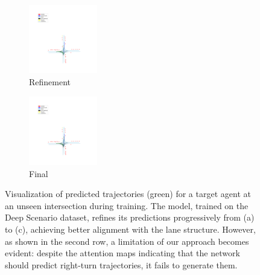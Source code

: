 \begin{figure}
\begin{subfigure}[t]{0.3\linewidth}
        \includegraphics[height=3cm,trim={280 170 300 380},clip]{images_results/1337_minADE5_9.3_1-min.png}
        \caption{Refinement}
    \end{subfigure}
    \begin{subfigure}[t]{0.3\linewidth}
        \includegraphics[height=3cm,trim={280 170 300 380},clip]{images_results/1337_minADE5_9.3_2-min.png}
        \caption{Final}
    \end{subfigure}
    \caption{Visualization of predicted trajectories (green) for a target agent at an unseen intersection during training. The model, trained on the Deep Scenario dataset, refines its predictions progressively from (a) to (c), achieving better alignment with the lane structure. However, as shown in the second row, a limitation of our approach becomes evident: despite the attention maps indicating that the network should predict right-turn trajectories, it fails to generate them.}
    \label{fig:cross_data_qual}    
\end{figure}

